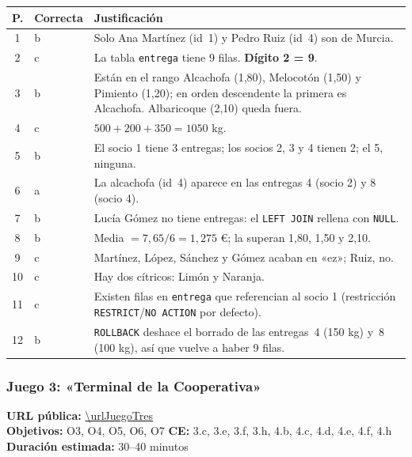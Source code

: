 \documentclass[11pt,a4paper]{article}
\begin{document}
\begin{solucion}
\begin{tabularx}{\linewidth}{@{}clX@{}}
\toprule
\textbf{P.} & \textbf{Correcta} & \textbf{Justificación} \\
\midrule
1  & b & Solo Ana Martínez (id~1) y Pedro Ruiz (id~4) son de Murcia. \\
2  & c & La tabla \texttt{entrega} tiene 9 filas. \textbf{Dígito 2 = 9}. \\
3  & b & Están en el rango Alcachofa (1,80), Melocotón (1,50) y Pimiento (1,20); en orden descendente
         la primera es Alcachofa. Albaricoque (2,10) queda fuera. \\
4  & c & $500 + 200 + 350 = 1050$ kg. \\
5  & b & El socio 1 tiene 3 entregas; los socios 2, 3 y 4 tienen 2; el 5, ninguna. \\
6  & a & La alcachofa (id~4) aparece en las entregas 4 (socio 2) y 8 (socio 4). \\
7  & b & Lucía Gómez no tiene entregas: el \texttt{LEFT JOIN} rellena con \texttt{NULL}. \\
8  & b & Media $= 7{,}65/6 = 1{,}275$ €; la superan 1,80, 1,50 y 2,10. \\
9  & c & Martínez, López, Sánchez y Gómez acaban en «ez»; Ruiz, no. \\
10 & c & Hay dos cítricos: Limón y Naranja. \\
11 & c & Existen filas en \texttt{entrega} que referencian al socio 1 (restricción
         \texttt{RESTRICT}/\texttt{NO ACTION} por defecto). \\
12 & b & \texttt{ROLLBACK} deshace el borrado de las entregas~4 (150 kg) y~8 (100 kg),
         así que vuelve a haber 9 filas. \\
\bottomrule
\end{tabularx}
\end{solucion}

\subsubsection{Juego 3: «Terminal de la Cooperativa»}

\begin{nota}
\textbf{URL pública:} \url{\urlJuegoTres}\\
\textbf{Objetivos:} O3, O4, O5, O6, O7 \quad
\textbf{CE:} 3.c, 3.e, 3.f, 3.h, 4.b, 4.c, 4.d, 4.e, 4.f, 4.h \quad
\textbf{Duración estimada:} 30–40 minutos
\end{nota}
\end{document}
